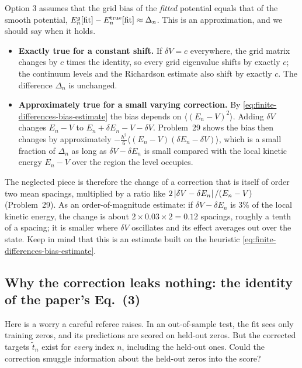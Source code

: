 Option 3 assumes that the grid bias of the \emph{fitted} potential equals that of the smooth potential, $E_n^{g}[\mathrm{fit}]-E_n^{\rm true}[\mathrm{fit}]\approx\Delta_n$. This is an approximation, and we should say when it holds.
\begin{itemize}
\item \textbf{Exactly true for a constant shift.} If $\delta V=c$ everywhere, the grid matrix changes by $c$ times the identity, so every grid eigenvalue shifts by exactly $c$; the continuum levels and the Richardson estimate also shift by exactly $c$. The difference $\Delta_n$ is unchanged.
\item \textbf{Approximately true for a small varying correction.} By \eqref{eq:finite-differences-bias-estimate} the bias depends on $\langle(E_n-V)^2\rangle$. Adding $\delta V$ changes $E_n-V$ to $E_n+\delta E_n-V-\delta V$. Problem~29 shows the bias then changes by approximately $-\tfrac{h^2}{6}\langle(E_n-V)(\delta E_n-\delta V)\rangle$, which is a small fraction of $\Delta_n$ as long as $\delta V-\delta E_n$ is small compared with the local kinetic energy $E_n-V$ over the region the level occupies.
\end{itemize}
The neglected piece is therefore the change of a correction that is itself of order two mean spacings, multiplied by a ratio like $2\left\lvert \delta V-\delta E_n\right\rvert/(E_n-V)$ (Problem~29). As an order-of-magnitude estimate: if $\delta V-\delta E_n$ is $3\%$ of the local kinetic energy, the change is about $2\times0.03\times2=0.12$ spacings, roughly a tenth of a spacing; it is smaller where $\delta V$ oscillates and its effect averages out over the state. Keep in mind that this is an estimate built on the heuristic \eqref{eq:finite-differences-bias-estimate}.

\subsection{Why the correction leaks nothing: the identity of the paper's Eq.~(3)}

Here is a worry a careful referee raises. In an out-of-sample test, the fit sees only training zeros, and its predictions are scored on held-out zeros. But the corrected targets $\tilde t_n$ exist for \emph{every} index $n$, including the held-out ones. Could the correction smuggle information about the held-out zeros into the score?

